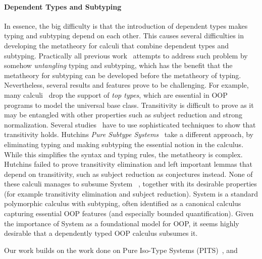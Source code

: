 \paragraph{Dependent Types and Subtyping}
In essence, the big difficulty is that the introduction of dependent
types makes typing and subtyping depend on each other. This causes
several difficulties in developing the metatheory for calculi that
combine dependent types and subtyping. Practically all previous
work~\cite{subdep,ptssub,chen1,cocsub,Chen03coc} attempts to address such problem by somehow
\emph{untangling} typing and subtyping, which has the benefit that the
metatheory for subtyping can be developed before the metatheory of
typing. Nevertheless, several results and features prove to be
challenging. For example, many calculi~\cite{subdep,ptssub}
drop the support of \emph{top types}, which are essential in OOP
programs to model the universal base class. Transitivity is difficult
to prove as it may be entangled with other properties such as
subject reduction and strong normalization.
Several studies~\cite{subdep,chen1} have
to use sophisticated techniques to show that transitivity
holds. Hutchins \emph{Pure
  Subtype Systems}~\cite{hutchins} take a different approach, by
eliminating typing and making subtyping the essential notion in the
calculus.  While this simplifies the syntax and typing rules, the metatheory is complex. Hutchins failed
to prove transitivity elimination and left
important lemmas that depend on transitivity, such as
subject reduction as
conjectures instead.
None of these calculi manages to subsume
System \fsub~\cite{fsub}, together with its desirable properties (for
example transitivity elimination and subject reduction). System
\fsub is a standard polymorphic calculus with subtyping, often
identified as a canonical calculus capturing
essential OOP features (and especially bounded quantification).
Given the importance of System \fsub as a foundational
model for OOP, it seems highly desirable that a dependently
typed OOP calculus subsumes it.

Our work builds on the work done on Pure Iso-Type Systems (PITS)~\cite{yang2019pure}, and

